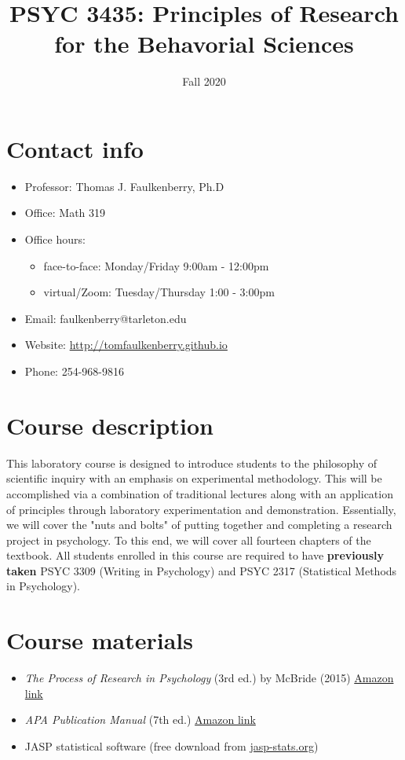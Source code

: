 \documentclass[10pt]{article}
\date{Fall 2020}
\title{PSYC 3435: Principles of Research for the Behavorial Sciences}
\begin{document}
\maketitle

\section*{Contact info}
\label{sec:org65c09f7}
\begin{itemize}
\item Professor: Thomas J. Faulkenberry, Ph.D
\item Office: Math 319
\item Office hours: 
\begin{itemize}
\item face-to-face: Monday/Friday 9:00am - 12:00pm
\item virtual/Zoom: Tuesday/Thursday 1:00 - 3:00pm
\end{itemize}
\item Email: faulkenberry@tarleton.edu
\item Website: \url{http://tomfaulkenberry.github.io}
\item Phone: 254-968-9816
\end{itemize}

\section*{Course description}
\label{sec:orgd135fa6}

This laboratory course is designed to introduce students to the philosophy of scientific inquiry with an emphasis on experimental methodology. This will be accomplished via a combination of traditional lectures along with an application of principles through laboratory experimentation and demonstration. Essentially, we will cover the "nuts and bolts" of putting together and completing a research project in psychology. To this end, we will cover all fourteen chapters of the textbook. All students enrolled in this course are required to have \textbf{previously taken} PSYC 3309 (Writing in Psychology) and PSYC 2317 (Statistical Methods in Psychology). 

\section*{Course materials}
\label{sec:org552bd4d}

\begin{itemize}
\item \emph{The Process of Research in Psychology} (3rd ed.) by McBride (2015) \href{https://www.amazon.com/Process-Research-Psychology-Dawn-McBride/dp/1483347605/}{Amazon link}
\item \emph{APA Publication Manual} (7th ed.) \href{https://www.amazon.com/Publication-Manual-American-Psychological-Association/dp/143383216X}{Amazon link}
\item JASP statistical software (free download from \href{http://jasp-stats.org}{jasp-stats.org})
\end{itemize}
\end{document}
